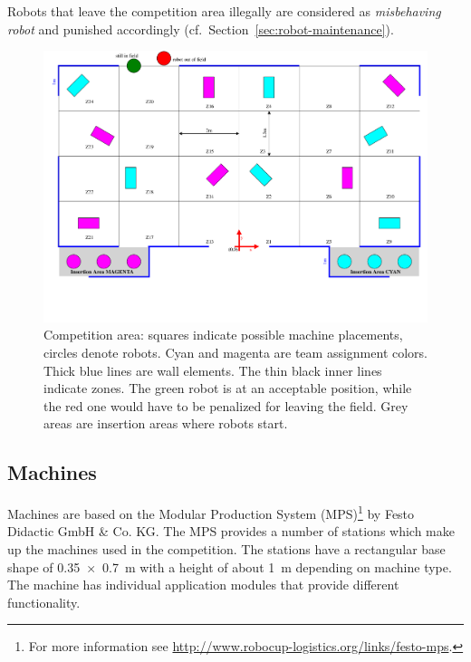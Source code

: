 \documentclass[12pt,twoside]{article}
\newcommand{\refsec}[1]{Section~\ref{#1}}
\begin{document}
Robots that leave the competition area illegally are considered as
\emph{misbehaving robot} and punished accordingly
(cf.~\refsec{sec:robot-maintenance}).

\begin{figure}
  \includegraphics[angle=-90 , trim = 30 80 20 0,
  scale=0.8]{field.pdf}
  \vspace{1ex}
  \caption{Competition area: squares indicate possible machine
    placements, circles denote robots. Cyan and magenta are team
    assignment colors. Thick blue lines are wall elements. The thin
    black inner lines indicate zones. The green robot is at an
    acceptable position, while the red one would have to be penalized
    for leaving the field. Grey areas are insertion areas where robots
    start.}
  \label{fig:competition-area}
\end{figure}

\subsection{Machines}
\label{sec:machines}
Machines are based on the Modular Production System (MPS)\footnote{For
  more information see
  \url{http://www.robocup-logistics.org/links/festo-mps}.} by Festo
Didactic GmbH \& Co. KG. The MPS provides a number of stations which
make up the machines used in the competition. The stations have a
rectangular base shape of \SI{0,35 x 0,7}{\metre} with a height of
about \SI{1}{\metre} depending on machine type. The machine
has individual application modules that provide different
functionality.
\end{document}
